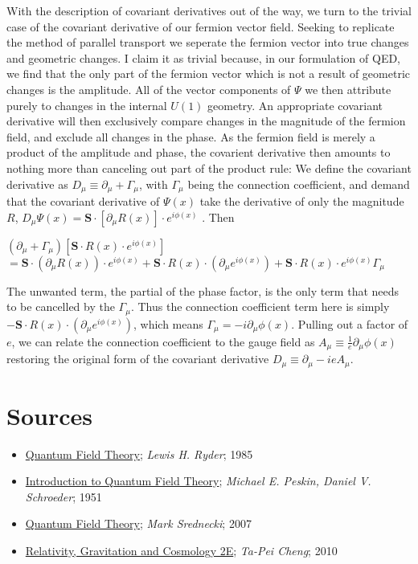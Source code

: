 \documentclass{article}
\begin{document}
        With the description of covariant derivatives out of the way, we turn to the trivial case of the covariant derivative of our fermion vector field. Seeking to replicate the method of parallel transport we seperate the fermion vector into true changes and geometric changes. I claim it as trivial because, in our formulation of QED, we find that the only part of the fermion vector which is not a result of geometric changes is the amplitude. All of the vector components of $\Psi$ we then attribute purely to changes in the internal $U(1)$ geometry. An appropriate covariant derivative will then exclusively compare changes in the magnitude of the fermion field, and exclude all changes in the phase. As the fermion field is merely a product of the amplitude and phase, the covarient derivative then amounts to nothing more than canceling out part of the product rule:
        We define the covariant derivative as $ D_\mu \equiv \partial_\mu + \Gamma_\mu $, with $\Gamma_\mu$ being the connection coefficient,
        and demand that the covariant derivative of $ \Psi(x) $ take the derivative of only the magnitude $R$,
        $D_\mu \Psi(x) = \mathbf{S} \cdot [\partial_\mu R(x) ] \cdot e^{i\phi(x)} $ . Then
        
        $ (\partial_\mu + \Gamma_\mu) [  \mathbf{S} \cdot R(x) \cdot e^{i\phi(x)} ] $ 
        $ = \mathbf{S} \cdot (\partial_\mu R(x) ) \cdot e^{i\phi(x)} +
           \mathbf{S} \cdot  R(x)  \cdot (\partial_\mu e^{i\phi(x)}) +
           \mathbf{S} \cdot  R(x)  \cdot e^{i\phi(x)} \Gamma_\mu $

        The unwanted term, the partial of the phase factor, is the only term that needs to be cancelled by the $\Gamma_\mu$. Thus the connection coefficient term here is simply $ - \mathbf{S} \cdot  R(x)  \cdot (\partial_\mu e^{i\phi(x)})  $, which means 
        $\Gamma_\mu = - i \partial_\mu \phi(x) $. Pulling out a factor of $e$, we can relate the connection coefficient to the gauge field
        as $A_\mu \equiv \frac{1}{e} \partial_\mu \phi(x)$ restoring the original form of the covariant derivative
        $ D_\mu \equiv \partial_\mu - i e A_\mu $.

        \clearpage
        \section{Sources}
                \begin{itemize}
                        \item \underline{Quantum Field Theory}; \textit{Lewis H. Ryder}; 1985
                        \item \underline{Introduction to Quantum Field Theory}; \textit{Michael E. Peskin, Daniel V. Schroeder}; 1951
                        \item \underline{Quantum Field Theory}; \textit{Mark Srednecki}; 2007
                        \item \underline{Relativity, Gravitation and Cosmology 2E}; \textit{Ta-Pei Cheng}; 2010
                \end{itemize}
\end{document}
